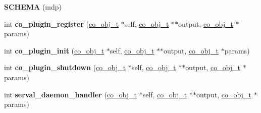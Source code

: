 \begin{DoxyCompactItemize}
\item 
\hypertarget{serval-dna_8c_a2fdb05eee64a7e5ebcf76b5859c92839}{{\bfseries S\-C\-H\-E\-M\-A} (mdp)}\label{serval-dna_8c_a2fdb05eee64a7e5ebcf76b5859c92839}

\item 
\hypertarget{serval-dna_8c_a3bbb939458a3edc82ae0bfe5602967df}{int {\bfseries co\-\_\-plugin\-\_\-register} (\hyperlink{structco__obj__t}{co\-\_\-obj\-\_\-t} $\ast$self, \hyperlink{structco__obj__t}{co\-\_\-obj\-\_\-t} $\ast$$\ast$output, \hyperlink{structco__obj__t}{co\-\_\-obj\-\_\-t} $\ast$params)}\label{serval-dna_8c_a3bbb939458a3edc82ae0bfe5602967df}

\item 
\hypertarget{serval-dna_8c_a0eccb03577be7f0f0e22a4d427f8773f}{int {\bfseries co\-\_\-plugin\-\_\-init} (\hyperlink{structco__obj__t}{co\-\_\-obj\-\_\-t} $\ast$self, \hyperlink{structco__obj__t}{co\-\_\-obj\-\_\-t} $\ast$$\ast$output, \hyperlink{structco__obj__t}{co\-\_\-obj\-\_\-t} $\ast$params)}\label{serval-dna_8c_a0eccb03577be7f0f0e22a4d427f8773f}

\item 
\hypertarget{serval-dna_8c_adef3d509f8db4a677d75c4bca5142d8a}{int {\bfseries co\-\_\-plugin\-\_\-shutdown} (\hyperlink{structco__obj__t}{co\-\_\-obj\-\_\-t} $\ast$self, \hyperlink{structco__obj__t}{co\-\_\-obj\-\_\-t} $\ast$$\ast$output, \hyperlink{structco__obj__t}{co\-\_\-obj\-\_\-t} $\ast$params)}\label{serval-dna_8c_adef3d509f8db4a677d75c4bca5142d8a}

\item 
\hypertarget{serval-dna_8c_a31d498ab46d883bda2967eca577b8890}{int {\bfseries serval\-\_\-daemon\-\_\-handler} (\hyperlink{structco__obj__t}{co\-\_\-obj\-\_\-t} $\ast$self, \hyperlink{structco__obj__t}{co\-\_\-obj\-\_\-t} $\ast$$\ast$output, \hyperlink{structco__obj__t}{co\-\_\-obj\-\_\-t} $\ast$params)}\label{serval-dna_8c_a31d498ab46d883bda2967eca577b8890}

\end{DoxyCompactItemize}
